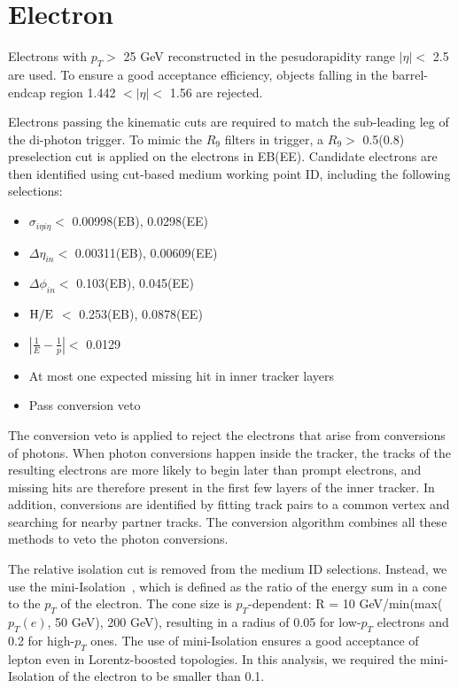 \documentclass[thesis.tex]{subfiles}
\renewcommand\_{\textunderscore\allowbreak}
\begin{document}
\section{Electron}
\label{sec:electronID} 
Electrons with  $p_{T} >$ 25 GeV reconstructed in the pesudorapidity range $|\eta| <$ 2.5 are used. To ensure a good acceptance efficiency, objects falling in the barrel-endcap region 1.442 $< |\eta| <$ 1.56 are rejected. 

Electrons passing the kinematic cuts are required to match the sub-leading leg of the di-photon trigger. 
To mimic the $R_9$ filters in trigger, a $R_9 >$ 0.5(0.8) preselection cut is applied on the electrons in EB(EE). 
Candidate electrons are then identified using cut-based medium working point ID, including the following selections:

\begin{center}
\begin{itemize}
\item $\sigma_{i\eta i\eta} <$ 0.00998(EB), 0.0298(EE)
\item $\Delta\eta_{in} <$ 0.00311(EB), 0.00609(EE)
\item $\Delta\phi_{in} <$ 0.103(EB), 0.045(EE)
\item $\mathrm{H/E}$ $<$ 0.253(EB), 0.0878(EE)
\item $|\frac{1}{E} - \frac{1}{p}| <$ 0.0129
\item At most one expected missing hit in inner tracker layers
\item Pass conversion veto
\end{itemize}
\end{center}

The conversion veto is applied to reject the electrons that arise from conversions of photons.
When photon conversions happen inside the tracker, the tracks of the resulting electrons are more likely to begin later than prompt electrons, and missing hits are therefore present in the first few layers of the inner tracker. 
In addition, conversions are identified by fitting track pairs to a common vertex and searching for nearby partner tracks.
The conversion algorithm combines all these methods to veto the photon conversions.

The relative isolation cut is removed from the medium ID selections. 
Instead, we use the mini-Isolation~\cite{CMS:Isolation}, which is defined as the ratio of the energy sum in a cone to the $p_T$ of the electron.
The cone size is $p_T$-dependent: R = 10 GeV/min(max($p_T(e)$, 50 GeV), 200 GeV), resulting in a radius of 0.05 for low-$p_T$ electrons and 0.2 for high-$p_T$ ones. 
The use of mini-Isolation ensures a good acceptance of lepton even in Lorentz-boosted topologies.
In this analysis, we required the mini-Isolation of the electron to be smaller than 0.1. 
\end{document}
